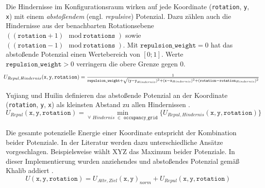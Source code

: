 \vspace*{-0.1cm}
Die Hindernisse im Konfigurationsraum wirken auf jede Koordinate (\texttt{rotation}, \texttt{y}, \texttt{x}) mit einem \textit{abstoßendem} (engl. \textit{repulsive}) Potenzial. Dazu zählen auch die Hindernisse aus der benachbarten Rotationsebene $((\texttt{rotation} + 1) \mod \texttt{rotations})$ sowie $((\texttt{rotation} - 1) \mod \texttt{rotations})$. Mit $\texttt{repulsion\_weight}=0$ hat das abstoßende Potenzial einen Wertebereich von $[0;1]$. Werte $\texttt{repulsion\_weight} > 0 $ verringern die obere Grenze gegen $0$.
\vspace*{0.2cm}
\begin{equation*}
\hspace*{-0.04\linewidth}
\resizebox{1.1\linewidth}{!}{
  $ U_{Repul, Hindernis}(\texttt{x}, \texttt{y}, \texttt{rotation}) = \frac{1}{\texttt{repulsion\_weight} + \sqrt{(\texttt{y} - \texttt{y}_{Hindernis})^2 + (\texttt{x} - \texttt{x}_{Hindernis})^2 + (\texttt{rotation} - \texttt{rotation}_{Hindernis})^2}}
$}
\hspace*{-0.06\linewidth}
\end{equation*}

\vspace*{-0.1cm}
Yujiang und Huilin definieren das abstoßende Potenzial an der Koordinate (\texttt{rotation}, \texttt{y}, \texttt{x}) als kleinsten Abstand zu allen Hindernissen \cite{yujiang.2017}.
\vspace*{0.2cm}
\begin{equation*}
U_{Repul}(\texttt{x}, \texttt{y}, \texttt{rotation}) = \min_{\forall \,\,Hindernis \,\,\in \texttt{ occupancy\_grid}} \{ U_{Repul, Hindernis}(\texttt{x}, \texttt{y}, \texttt{rotation}) \}
\end{equation*}

\vspace*{-0.1cm}
Die gesamte potenzielle Energie einer Koordinate entspricht der Kombination beider Potenziale.
In der Literatur werden dazu unterschiedliche Ansätze vorgeschlagen. Beispielsweise wählt XYZ das Maximum beider Potenziale. In dieser Implementierung wurden anziehendes und abstoßendes Potenzial gemäß Khalib addiert \cite{khatib.1985}.
\vspace*{0.2cm}
\begin{equation*}
U(\texttt{x}, \texttt{y}, \texttt{rotation}) = U_{Attr, Ziel}(\texttt{x}, \texttt{y})_{norm} + U_{Repul}(\texttt{x}, \texttt{y}, \texttt{rotation})
\end{equation*}

